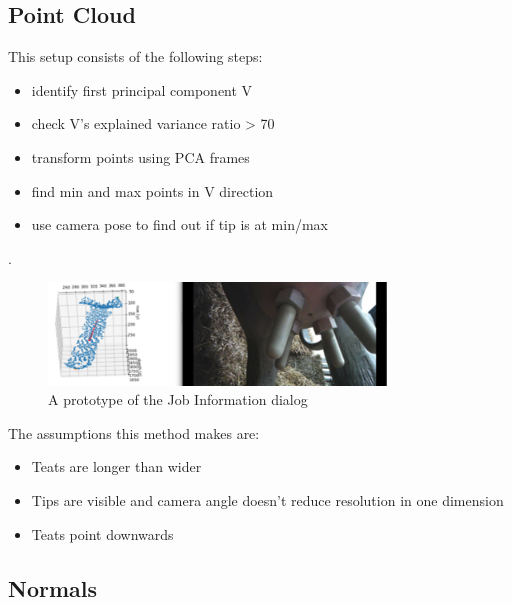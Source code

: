     \subsection{Point Cloud}
    
    \lipsum[2-3]
    This setup consists of the following steps:
        \begin{itemize}
        \item identify first principal component V
        \item check V's explained variance ratio > 70%
        \item transform points using PCA frames
        \item find min and max points in V direction
        \item use camera pose to find out if tip is at min/max
        \end{itemize}.
    \begin{figure}[!ht]
        \centering
        \includegraphics[width=0.8\textwidth]{images/cow_pca.png}
        \caption{A prototype of the Job Information dialog}
        \label{fig:cow_fmc}
    \end{figure}
    
    The assumptions this method makes are:
    \begin{itemize}
        \item Teats are longer than wider
        \item Tips are visible and camera angle doesn't reduce resolution in one dimension
        \item Teats point downwards
    \end{itemize}
    \lipsum[2-3]
    
    \subsection{Normals}
    

    
    
